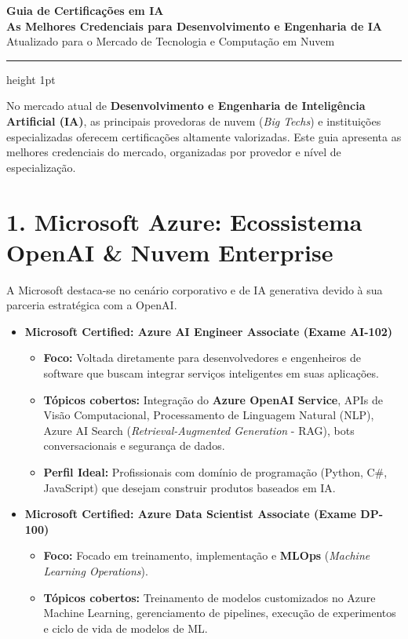 \documentclass[11pt, a4paper]{article}
\begin{document}
\begin{center}
    {\color{primary}\Huge\bfseries Guia de Certificações em IA}\\[6pt]
    {\color{secondary}\Large\bfseries As Melhores Credenciais para Desenvolvimento e Engenharia de IA}\\[12pt]
    {\color{darkgray}\small Atualizado para o Mercado de Tecnologia e Computação em Nuvem}
\end{center}

\vspace{1em}
\hrule height 1pt
\vspace{1.5em}

\noindent No mercado atual de \textbf{Desenvolvimento e Engenharia de Inteligência Artificial (IA)}, as principais provedoras de nuvem (\textit{Big Techs}) e instituições especializadas oferecem certificações altamente valorizadas. Este guia apresenta as melhores credenciais do mercado, organizadas por provedor e nível de especialização.

\vspace{1.5em}

\section*{\color{primary}1. Microsoft Azure: Ecossistema OpenAI \& Nuvem Enterprise}
A Microsoft destaca-se no cenário corporativo e de IA generativa devido à sua parceria estratégica com a OpenAI.

\begin{itemize}
    \item \textbf{Microsoft Certified: Azure AI Engineer Associate (Exame AI-102)}
    \begin{itemize}
        \item \textbf{Foco:} Voltada diretamente para desenvolvedores e engenheiros de software que buscam integrar serviços inteligentes em suas aplicações.
        \item \textbf{Tópicos cobertos:} Integração do \textbf{Azure OpenAI Service}, APIs de Visão Computacional, Processamento de Linguagem Natural (NLP), Azure AI Search (\textit{Retrieval-Augmented Generation} - RAG), bots conversacionais e segurança de dados.
        \item \textbf{Perfil Ideal:} Profissionais com domínio de programação (Python, C\#, JavaScript) que desejam construir produtos baseados em IA.
    \end{itemize}

    \item \textbf{Microsoft Certified: Azure Data Scientist Associate (Exame DP-100)}
    \begin{itemize}
        \item \textbf{Foco:} Focado em treinamento, implementação e \textbf{MLOps} (\textit{Machine Learning Operations}).
        \item \textbf{Tópicos cobertos:} Treinamento de modelos customizados no Azure Machine Learning, gerenciamento de pipelines, execução de experimentos e ciclo de vida de modelos de ML.
    \end{itemize}
\end{itemize}
\end{document}

